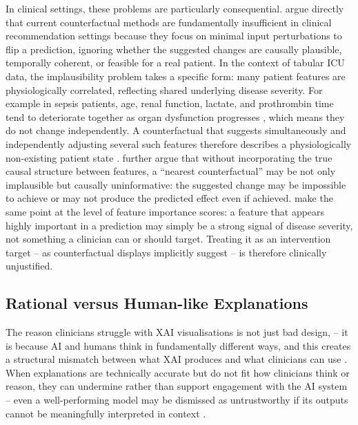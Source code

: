 \documentclass[12pt, a4paper]{article}
\begin{document}
In clinical settings, these problems are particularly consequential.
\citet{chukwu2025counterfactual} argue directly that current counterfactual
methods are fundamentally insufficient in clinical recommendation settings
because they focus on minimal input perturbations to flip a prediction,
ignoring whether the suggested changes are causally plausible, temporally
coherent, or feasible for a real patient. In the context of tabular ICU
data, the implausibility problem takes a specific form: many patient
features are physiologically correlated, reflecting shared underlying
disease severity. For example in sepsis patients, age, renal function, lactate, and
prothrombin time tend to deteriorate together as organ dysfunction
progresses \citep{alghatani2024sepsis}, which means they do not change
independently. A counterfactual that suggests simultaneously and
independently adjusting several such features therefore describes a
physiologically non-existing patient state
\citep{keane2020good, karimi2021algorithmic}. \citet{karimi2021algorithmic} further argue that
without incorporating the true causal structure between features, a
``nearest counterfactual'' may be not only implausible but causally
uninformative: the suggested change may be impossible to achieve or may
not produce the predicted effect even if achieved. \citet{janzing2020feature} make the same point at the level of
feature importance scores: a feature that appears highly important in a
prediction may simply be a strong signal of disease severity, not
something a clinician can or should target. Treating it as an
intervention target -- as counterfactual displays implicitly suggest --
is therefore clinically unjustified. 

\subsection{Rational versus Human-like Explanations}
\label{sec:prelim_rational}

The reason clinicians struggle with XAI visualisations is not just bad design, 
-- it is because AI and humans think in fundamentally different ways, and this
creates a structural mismatch between what XAI produces and what clinicians can use
\citep{miller2019explanation,liaovarshney2021human}. 
When explanations are technically accurate but do not fit how clinicians
think or reason, they can undermine rather than support engagement with the
AI system -- even a well-performing model may be dismissed as untrustworthy
if its outputs cannot be meaningfully interpreted in context
\citep{liaovarshney2021human, doshivelez2017rigorous}.
\end{document}
